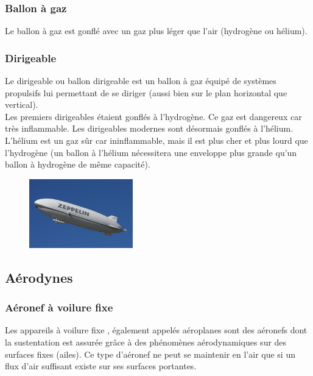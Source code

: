 	\subsubsection{Ballon à gaz}
	Le ballon à gaz  est gonflé avec un gaz plus léger que l'air (hydrogène ou hélium).	
	
	\subsubsection{Dirigeable}
	Le dirigeable  ou ballon dirigeable est un ballon à gaz équipé de systèmes propulsifs lui permettant de se diriger (aussi bien sur le plan horizontal que vertical). \\
	
	Les premiers dirigeables étaient gonflés à l'hydrogène. Ce gaz est dangereux car très inflammable. Les dirigeables modernes sont désormais gonflés à l'hélium. L'hélium est un gaz sûr car ininflammable, mais il est plus cher et plus lourd que l'hydrogène (un ballon à l'hélium nécessitera une enveloppe plus grande qu'un ballon à hydrogène de même capacité).
	
	
	\begin{figure}[H]
  	\centering
    \includegraphics[width=0.4\textwidth]{01-EtudeAeronefs/img/dirigeable.jpg}
	\end{figure}	

\subsection{Aérodynes}
	\subsubsection{Aéronef à voilure fixe}
		Les appareils à voilure fixe , également appelés aéroplanes sont des aéronefs dont la sustentation est assurée grâce à des phénomènes aérodynamiques sur des surfaces fixes (ailes). Ce type d'aéronef ne peut se maintenir en l'air que si un flux d'air suffisant existe sur ses surfaces portantes.

